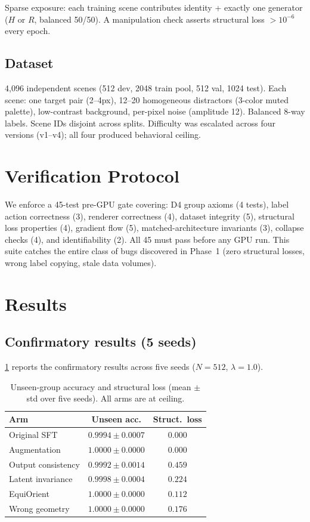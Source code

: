 \documentclass[10pt,twocolumn,letterpaper]{article}
\begin{document}
Sparse exposure: each training scene contributes identity + exactly one
generator ($H$ or $R$, balanced 50/50). A manipulation check asserts
structural loss $> 10^{-6}$ every epoch.

\subsection{Dataset}

4,096 independent scenes (512 dev, 2048 train pool, 512 val, 1024 test).
Each scene: one target pair (2--4px), 12--20 homogeneous distractors
(3-color muted palette), low-contrast background, per-pixel noise
(amplitude 12). Balanced 8-way labels. Scene IDs disjoint across splits.
Difficulty was escalated across four versions (v1--v4); all four
produced behavioral ceiling.

\section{Verification Protocol}
\label{sec:protocol}

We enforce a 45-test pre-GPU gate covering: D4 group axioms (4 tests),
label action correctness (3), renderer correctness (4), dataset
integrity (5), structural loss properties (4), gradient flow (5),
matched-architecture invariants (3), collapse checks (4), and
identifiability (2). All 45 must pass before any GPU run. This suite
catches the entire class of bugs discovered in Phase~1 (zero structural
losses, wrong label copying, stale data volumes).

\section{Results}
\label{sec:results}

\subsection{Confirmatory results (5 seeds)}

\ref{tab:main} reports the confirmatory results across five seeds
($N=512$, $\lambda=1.0$).

\begin{table}[t]
\centering\small
\begin{tabular}{lcc}
\toprule
Arm & Unseen acc. & Struct.\ loss \\
\midrule
Original SFT & $0.9994 \pm 0.0007$ & $0.000$ \\
Augmentation & $1.0000 \pm 0.0000$ & $0.000$ \\
Output consistency & $0.9992 \pm 0.0014$ & $0.459$ \\
Latent invariance & $0.9998 \pm 0.0004$ & $0.224$ \\
EquiOrient & $1.0000 \pm 0.0000$ & $0.112$ \\
Wrong geometry & $1.0000 \pm 0.0000$ & $0.176$ \\
\bottomrule
\end{tabular}
\caption{Unseen-group accuracy and structural loss (mean $\pm$ std over
five seeds). All arms are at ceiling.}
\label{tab:main}
\end{table}
\end{document}
